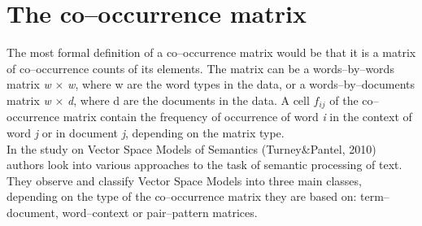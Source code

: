 

\section{The co--occurrence matrix} \label{coOcMatrix}
The most formal definition of a co--occurrence matrix would be that it is a matrix of co--occurrence counts of its elements. The matrix can be a words--by--words matrix \textit{w} $\times$ \textit{w}, where w are the word types in the data, or a words--by--documents matrix \textit{w} $\times$ \textit{d}, where d are the documents in the data. A cell $f_{ij}$ of the co--occurrence matrix contain the frequency of occurrence of word \textit{i} in the context of word \textit{j} or in document \textit{j}, depending on the matrix type.
\\In the study on Vector Space Models of Semantics (Turney\&Pantel, 2010)\cite{journals/corr/abs-1003-1141} authors look into various approaches to the task of  semantic processing of text. They observe and classify Vector Space Models into three main classes, depending on the type of the co--occurrence matrix they are based on: term--document, word--context or pair--pattern matrices. 

